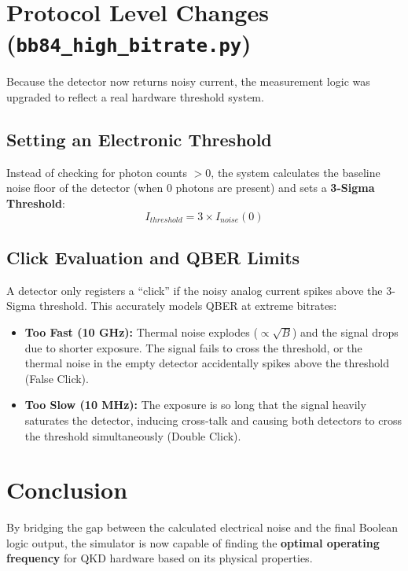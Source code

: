 \documentclass[12pt,a4paper]{article}
\begin{document}
\section{Protocol Level Changes (\texttt{bb84\_high\_bitrate.py})}
Because the detector now returns noisy current, the measurement logic was upgraded to reflect a real hardware threshold system.

\subsection{Setting an Electronic Threshold}
Instead of checking for photon counts $> 0$, the system calculates the baseline noise floor of the detector (when 0 photons are present) and sets a \textbf{3-Sigma Threshold}:
\begin{equation}
I_{threshold} = 3 \times I_{noise}(0)
\end{equation}

\subsection{Click Evaluation and QBER Limits}
A detector only registers a ``click'' if the noisy analog current spikes above the 3-Sigma threshold. This accurately models QBER at extreme bitrates:
\begin{itemize}
    \item \textbf{Too Fast (10 GHz):} Thermal noise explodes ($\propto \sqrt{B}$) and the signal drops due to shorter exposure. The signal fails to cross the threshold, or the thermal noise in the empty detector accidentally spikes above the threshold (False Click).
    \item \textbf{Too Slow (10 MHz):} The exposure is so long that the signal heavily saturates the detector, inducing cross-talk and causing both detectors to cross the threshold simultaneously (Double Click).
\end{itemize}

\section{Conclusion}
By bridging the gap between the calculated electrical noise and the final Boolean logic output, the simulator is now capable of finding the \textbf{optimal operating frequency} for QKD hardware based on its physical properties.
\end{document}
